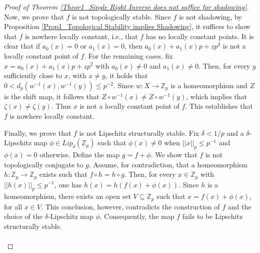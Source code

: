 \documentclass[a4paper, 12pt]{article}
\theoremstyle{definition}
\begin{document}
\begin{proof}[Proof of Theorem \ref{Theor1_Single Right Inverse does not suffice for shadowing}]
		Now, we prove that $f$ is not topologically stable. Since $f$ is not shadowing, by Proposition \ref{Prop1_Topological Stability implies Shadowing}, it suffices to show that $f$ is nowhere locally constant, i.e., that $f$ has no locally constant points. 
		It is clear that if $ a_{0} \left(  x  \right)  = 0$ or $a_{1} \left(  x  \right) = 0$, then $a_{0} \left(  x  \right)   + a_{1} \left(  x  \right)  p + z p^{2}$ is not a locally constant point of $f$. 
		For the remaining cases, fix $x= a_{0} \left(  x  \right)  +  a_{1} \left(  x  \right)  p + z p^{2}$ with $a_{0} \left(  x  \right)  \neq 0$ and $ a_{1} \left(  x  \right)  \neq 0$. Then, for every $y$ sufficiently close to $x$, with $x \neq y$, it holds that $0  <  d_{p} \left(  w^{-1} \left(  x  \right) ,  w^{-1} \left(  y  \right)   \right)  \le p^{-2}$. 
		Since $w: X \to \mathbb{Z}_{p}$ is a homeomorphism and $Z$ is the shift map, it follows that $Z\circ w^{-1}(x) \neq Z \circ w^{-1}(y)$, which implies that $\zeta \left(  x  \right)  \neq \zeta \left(  y  \right) $. Thus $x$ is not a locally constant point of $f$.  
		This establishes that $f$ is nowhere locally constant. 
		
		Finally, we prove that $f$ is not Lipschitz structurally stable. Fix $\delta  < 1/p$ and a $\delta$-Lipschitz map $\phi \in Lip_{\delta} \left(  \mathbb{Z}_{p}  \right) $ such that $\phi \left(  x  \right)  \neq 0$ when $  \left| \left|  x  \right|  \right|_{p} \le p^{-1}$ and $\phi(x) = 0 $ otherwise. 
		Define the map $g = f + \phi$. We show that $f$ is not topologically conjugate to $g$. 
		Assume, for contradiction, that a homeomorphism $h: \mathbb{Z}_{p} \to \mathbb{Z}_{p}$ exists such that $f \circ h = h \circ g$. 
		Then, for every $x \in \mathbb{Z}_{p}$ with $ \left| \left|  h \left(  x  \right)   \right|  \right|_{p} \le p^{-1}$, one has $h(x) = h \left(  f(x) + \phi \left(  x  \right)   \right) $. Since $h$ is a homeomorphism, there exists an open set $V \subseteq \mathbb{Z}_{p}$ such that $x  = f(x) + \phi(x)$, for all $x \in V$. This conclusion, however, contradicts the construction of $f$ and the choice of the $\delta$-Lipschitz map $\phi$. Consequently, the map $f$ fails to be Lipschitz structurally stable.  
		
		
		\paragraph{} 
		

\end{proof}
\end{document}
